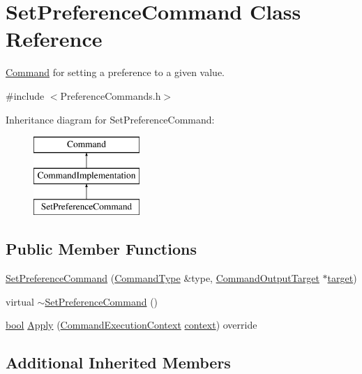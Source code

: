 \hypertarget{class_set_preference_command}{}\section{Set\+Preference\+Command Class Reference}
\label{class_set_preference_command}


\hyperlink{class_command}{Command} for setting a preference to a given value.  




{\ttfamily \#include $<$Preference\+Commands.\+h$>$}

Inheritance diagram for Set\+Preference\+Command\+:\begin{figure}[H]
\begin{center}
\leavevmode
\includegraphics[height=3.000000cm]{class_set_preference_command}
\end{center}
\end{figure}
\subsection*{Public Member Functions}
\begin{DoxyCompactItemize}
\item 
\hyperlink{class_set_preference_command_a37befe1e3571fa26af50205462b26453}{Set\+Preference\+Command} (\hyperlink{class_command_type}{Command\+Type} \&type, \hyperlink{class_command_output_target}{Command\+Output\+Target} $\ast$\hyperlink{lib_2expat_8h_a15a257516a87decb971420e718853137}{target})
\item 
virtual \hyperlink{class_set_preference_command_ac493a60e583ce5e3ebd56d7a6233746a}{$\sim$\+Set\+Preference\+Command} ()
\item 
\hyperlink{mac_2config_2i386_2lib-src_2libsoxr_2soxr-config_8h_abb452686968e48b67397da5f97445f5b}{bool} \hyperlink{class_set_preference_command_a9d4dcdb2a98fd200461f7fcb91c4e2f1}{Apply} (\hyperlink{class_command_execution_context}{Command\+Execution\+Context} \hyperlink{structcontext}{context}) override
\end{DoxyCompactItemize}
\subsection*{Additional Inherited Members}


